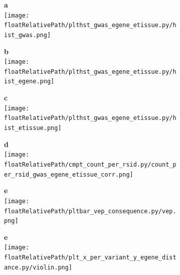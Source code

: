 \begin{figure}[!ht]
    \centering
    \begin{subfigure}[]{.49\textwidth}
        \textbf{a}
        \\
        \texttt{[image: \\floatRelativePath/plthst\_gwas\_egene\_etissue.py/hist\_gwas.png]}
    \end{subfigure}
    \begin{subfigure}[]{.49\textwidth}
        \textbf{b}
        \\
        \texttt{[image: \\floatRelativePath/plthst\_gwas\_egene\_etissue.py/hist\_egene.png]}
    \end{subfigure}

    \begin{subfigure}[]{.49\textwidth}
        \textbf{c}
        \\
        \texttt{[image: \\floatRelativePath/plthst\_gwas\_egene\_etissue.py/hist\_etissue.png]}
    \end{subfigure}
    \begin{subfigure}[]{.49\textwidth}
        \textbf{d}
        \\
        \texttt{[image: \\floatRelativePath/cmpt\_count\_per\_rsid.py/count\_per\_rsid\_gwas\_egene\_etissue\_corr.png]}
    \end{subfigure}

    \begin{subfigure}[]{.49\textwidth}
        \textbf{e}
        \\
        \texttt{[image: \\floatRelativePath/pltbar\_vep\_consequence.py/vep.png]}
    \end{subfigure}
    \begin{subfigure}[]{.49\textwidth}
        \textbf{e}
        \\
        \texttt{[image: \\floatRelativePath/plt\_x\_per\_variant\_y\_egene\_distance.py/violin.png]}
    \end{subfigure}

    \caption{}

\end{figure}

%
%


